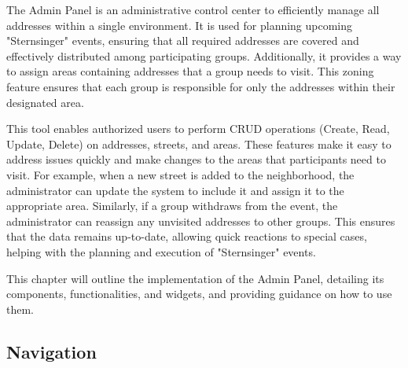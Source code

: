 \Author{\daAuthorOne}

The Admin Panel is an administrative control center to efficiently manage all addresses within a single environment. It is used for planning upcoming "Sternsinger" events, ensuring that all required addresses are covered and effectively distributed among participating groups. Additionally, it provides a way to assign areas containing addresses that a group needs to visit. This zoning feature ensures that each group is responsible for only the addresses within their designated area.

\blankLine

This tool enables authorized users to perform CRUD operations (Create, Read, Update, Delete) on addresses, streets, and areas. These features make it easy to address issues quickly and make changes to the areas that participants need to visit. For example, when a new street is added to the neighborhood, the administrator can update the system to include it and assign it to the appropriate area. Similarly, if a group withdraws from the event, the administrator can reassign any unvisited addresses to other groups. This ensures that the data remains up-to-date, allowing quick reactions to special cases, helping with the planning and execution of "Sternsinger" events.

\blankLine

This chapter will outline the implementation of the Admin Panel, detailing its components, functionalities, and widgets, and providing guidance on how to use them.

\subsection{Navigation}

